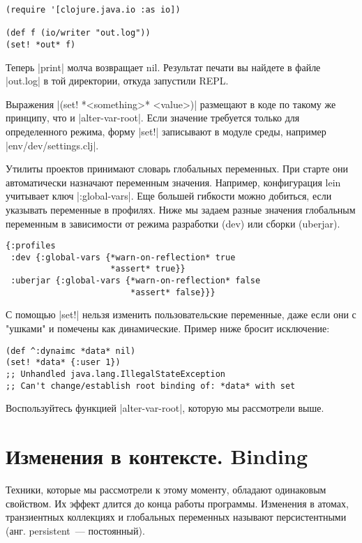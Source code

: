 \begin{verbatim}
(require '[clojure.java.io :as io])

(def f (io/writer "out.log"))
(set! *out* f)
\end{verbatim}

Теперь \spverb|print| молча возвращает nil. Результат печати вы найдете в файле
\spverb|out.log| в той директории, откуда запустили REPL.

Выражения \spverb|(set! *<something>* <value>)| размещают в коде по такому же принципу,
что и \spverb|alter-var-root|. Если значение требуется только для определенного режима,
форму \spverb|set!| записывают в модуле среды, например \spverb|env/dev/settings.clj|.

Утилиты проектов принимают словарь глобальных переменных. При старте они
автоматически назначают переменным значения. Например, конфигурация lein
учитывает ключ \spverb|:global-vars|. Еще большей гибкости можно добиться, если
указывать переменные в профилях. Ниже мы задаем разные значения глобальным
переменным в зависимости от режима разработки (dev) или сборки (uberjar).

\begin{verbatim}
{:profiles
 :dev {:global-vars {*warn-on-reflection* true
                     *assert* true}}
 :uberjar {:global-vars {*warn-on-reflection* false
                         *assert* false}}}
\end{verbatim}

С помощью \spverb|set!| нельзя изменить пользовательские переменные, даже если они с
"ушками" и помечены как динамические. Пример ниже бросит исключение:

\begin{verbatim}
(def ^:dynaimc *data* nil)
(set! *data* {:user 1})
;; Unhandled java.lang.IllegalStateException
;; Can't change/establish root binding of: *data* with set
\end{verbatim}

Воспользуйтесь функцией \spverb|alter-var-root|, которую мы рассмотрели выше.

\section{Изменения в контексте. Binding}

Техники, которые мы рассмотрели к этому моменту, обладают одинаковым
свойством. Их эффект длится до конца работы программы. Изменения в атомах,
транзиентных коллекциях и глобальных переменных называют персистентными
(анг. persistent~--- постоянный).

